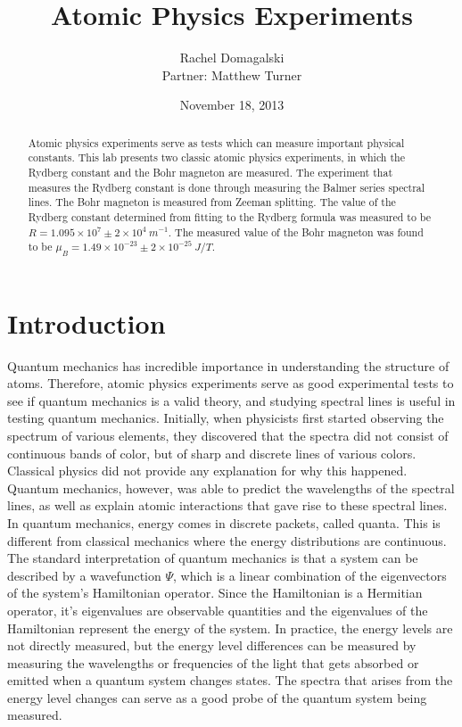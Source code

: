 \documentclass[11pt,letterpaper]{article}
\title{Atomic Physics Experiments}
\author{Rachel Domagalski\\
Partner: Matthew Turner}
\date{November 18, 2013}
\begin{document}
\maketitle

\begin{abstract}
    Atomic physics experiments serve as tests which can measure important
    physical constants. This lab presents two classic atomic physics
    experiments, in which the Rydberg constant and the Bohr magneton are
    measured. The experiment that measures the Rydberg constant is done through
    measuring the Balmer series spectral lines. The Bohr magneton is measured
    from Zeeman splitting. The value of the Rydberg constant determined from
    fitting to the Rydberg formula was measured to be
    $R = 1.095 \times 10^7 \pm 2 \times 10^4\ m^{-1}$. The measured value of the
    Bohr magneton was found to be
    $\mu_B = 1.49\times 10^{-23} \pm 2 \times 10^{-25}\ J/T$.
\end{abstract}

\section{Introduction}

Quantum mechanics has incredible importance in understanding the structure of
atoms. Therefore, atomic physics experiments serve as good experimental tests to
see if quantum mechanics is a valid theory, and studying spectral lines is
useful in testing quantum mechanics. Initially, when physicists first started
observing the spectrum of various elements, they discovered that the spectra did
not consist of continuous bands of color, but of sharp and discrete lines of
various colors. Classical physics did not provide any explanation for why this
happened. Quantum mechanics, however, was able to predict the wavelengths of the
spectral lines, as well as explain atomic interactions that gave rise to these
spectral lines.\\

In quantum mechanics, energy comes in discrete packets, called quanta. This is
different from classical mechanics where the energy distributions are
continuous. The standard interpretation of quantum mechanics is that a system
can be described by a wavefunction $\Psi$, which is a linear combination of the
eigenvectors of the system's Hamiltonian operator. Since the Hamiltonian is a
Hermitian operator, it's eigenvalues are observable quantities and the
eigenvalues of the Hamiltonian represent the energy of the system. In practice,
the energy levels are not directly measured, but the energy level differences
can be measured by measuring the wavelengths or frequencies of the light that
gets absorbed or emitted when a quantum system changes states. The spectra that
arises from the energy level changes can serve as a good probe of the quantum
system being measured.\\
\end{document}
